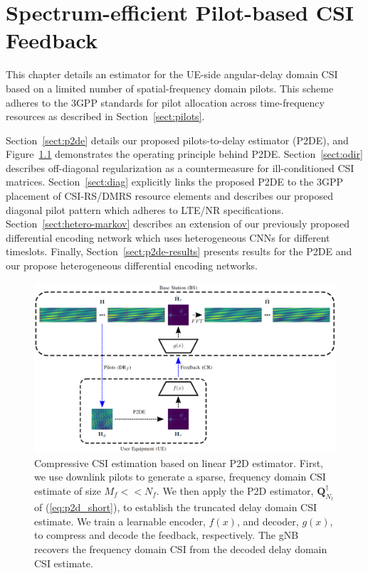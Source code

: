 \chapter{Spectrum-efficient Pilot-based CSI Feedback}
\label{chap:p2d}

This chapter details an estimator for the UE-side angular-delay domain CSI based on a limited number of spatial-frequency domain pilots. This scheme adheres to the 3GPP standards for pilot allocation across time-frequency resources as described in Section~\ref{sect:pilots}.

Section~\ref{sect:p2de} details our proposed pilots-to-delay estimator (P2DE), and Figure~\ref{fig:p2d} demonstrates the operating principle behind P2DE. Section~\ref{sect:odir} describes off-diagonal regularization as a countermeasure for ill-conditioned CSI matrices. Section~\ref{sect:diag} explicitly links the proposed P2DE to the 3GPP placement of CSI-RS/DMRS resource elements and describes our proposed diagonal pilot pattern which adheres to LTE/NR specifications. Section~\ref{sect:hetero-markov} describes an extension of our previously proposed differential encoding network which uses heterogeneous CNNs for different timeslots. Finally, Section~\ref{sect:p2de-results} presents results for the P2DE and our propose heterogeneous differential encoding networks.

\begin{figure}[!hbtp]
    \centering
    \includegraphics[width=\linewidth]{./images/00_downlink_p2d_feedback_horiz_diag.png}
    \caption{Compressive CSI estimation based on linear P2D estimator. First,
    we use downlink pilots to 
    generate a sparse, frequency domain CSI
    estimate 
    of size $M_f << N_f$. We then apply
    the P2D estimator, $\mathbf{Q}^\dag_{N_t}$ of (\ref{eq:p2d_short}), to establish 
    the truncated
    delay domain CSI estimate.
    We train a
    learnable encoder, 
    $f(x)$,
    and decoder, $g(x)$, to compress and decode the feedback, respectively. The 
    gNB recovers
    the frequency domain
    CSI from 
    the decoded 
    delay domain CSI estimate.}
    \label{fig:p2d}
\end{figure}

